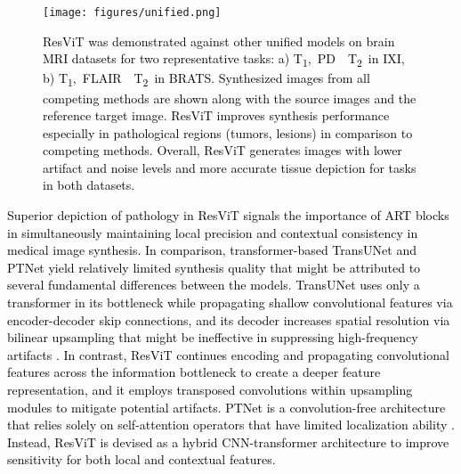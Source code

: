 \documentclass[journal,twoside,web]{ieeecolor}
\newcommand{\TonePDTtwo}{T\textsubscript{1},~PD~~T\textsubscript{2}}
\newcommand{\ToneFlairTtwo}{T\textsubscript{1},~FLAIR~~T\textsubscript{2}}
\newcommand*{\revhl}{\textcolor{black}}
\begin{document}
\begin{figure*}[t]
 \vspace{-0.5ex}
 \begin{minipage}[l]{0.72\textwidth}
\centerline{\texttt{[image: figures/unified.png]}}
 \end{minipage}\hfill
 \begin{minipage}[c]{0.28\textwidth}
\caption{\revhl{ResViT was demonstrated against other unified models on brain MRI datasets for two representative tasks: a) \TonePDTtwo~in IXI, b) \ToneFlairTtwo~in BRATS. Synthesized images from all competing methods are shown along with the source images and the reference target image. ResViT improves synthesis performance especially in pathological regions (tumors, lesions) in comparison to competing methods. Overall, ResViT generates images with lower artifact and noise levels and more accurate tissue depiction for tasks in both datasets.}}
\label{fig:unified}
 \end{minipage}
 \vspace{-2ex}
\end{figure*}
\par
\revhl{Superior depiction of pathology in ResViT signals the importance of ART blocks in simultaneously maintaining local precision and contextual consistency in medical image synthesis. In comparison, transformer-based TransUNet and PTNet yield relatively limited synthesis quality that might be attributed to several fundamental differences between the models. TransUNet uses only a transformer in its bottleneck while propagating shallow convolutional features via encoder-decoder skip connections, and its decoder increases spatial resolution via bilinear upsampling that might be ineffective in suppressing high-frequency artifacts \cite{upconv}. In contrast, ResViT continues encoding and propagating convolutional features across the information bottleneck to create a deeper feature representation, and it employs transposed convolutions within upsampling modules to mitigate potential artifacts. PTNet is a convolution-free architecture that relies solely on self-attention operators that have limited localization ability \cite{vit}. Instead, ResViT is devised as a hybrid CNN-transformer architecture to improve sensitivity for both local and contextual features.}
\end{document}
